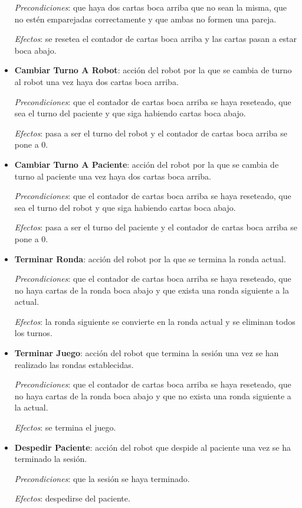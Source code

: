 \documentclass{uc3mpracticas}
\begin{document}
\begin{itemize}
      \textit{Precondiciones}: que haya dos cartas boca arriba que no sean la misma, que no estén emparejadas correctamente y que ambas no formen una pareja.

      \textit{Efectos}: se resetea el contador de cartas boca arriba y las cartas pasan a estar boca abajo.

    \item \textbf{Cambiar Turno A Robot}: acción del robot por la que se cambia de turno al robot una vez haya dos cartas boca arriba.

      \textit{Precondiciones}: que el contador de cartas boca arriba se haya reseteado, que sea el turno del paciente y que siga habiendo cartas boca abajo.

      \textit{Efectos}: pasa a ser el turno del robot y el contador de cartas boca arriba se pone a 0.

    \item \textbf{Cambiar Turno A Paciente}: acción del robot por la que se cambia de turno al paciente una vez haya dos cartas boca arriba.

      \textit{Precondiciones}: que el contador de cartas boca arriba se haya reseteado, que sea el turno del robot y que siga habiendo cartas boca abajo.

      \textit{Efectos}: pasa a ser el turno del paciente y el contador de cartas boca arriba se pone a 0.

    \item \textbf{Terminar Ronda}: acción del robot por la que se termina la ronda actual.

      \textit{Precondiciones}: que el contador de cartas boca arriba se haya reseteado, que no haya cartas de la ronda boca abajo y que exista una ronda siguiente a la actual.

      \textit{Efectos}: la ronda siguiente se convierte en la ronda actual y se eliminan todos los turnos.

    \item \textbf{Terminar Juego}: acción del robot que termina la sesión una vez se han realizado las rondas establecidas.

      \textit{Precondiciones}: que el contador de cartas boca arriba se haya reseteado, que no haya cartas de la ronda boca abajo y que no exista una ronda siguiente a la actual.

      \textit{Efectos}: se termina el juego.

    \item \textbf{Despedir Paciente}: acción del robot que despide al paciente una vez se ha terminado la sesión.

      \textit{Precondiciones}: que la sesión se haya terminado.

      \textit{Efectos}: despedirse del paciente.


  \end{itemize}
\end{document}
